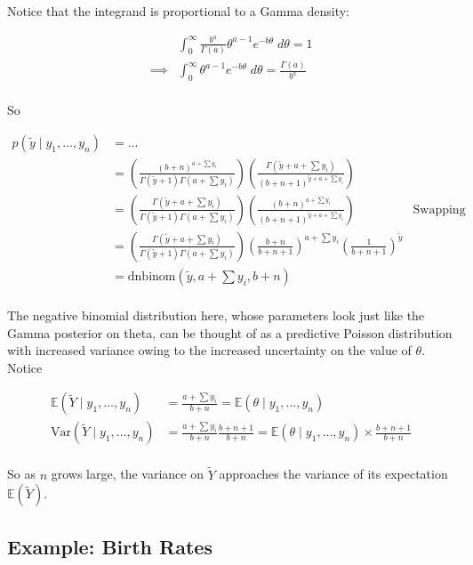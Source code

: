 \documentclass[
]{article}
\begin{document}
Notice that the integrand is proportional to a Gamma density:

\begin{align}
& \int_0^{\infty} \frac{b^a}{\Gamma(a)} \theta^{a - 1} e^{-b \theta} \; d\theta = 1\\
\implies& \int_0^{\infty} \theta^{a - 1} e^{-b\theta} \; d\theta = \frac{\Gamma(a)}{b^a} \\
\end{align}

So

\begin{align}
p(\tilde{y} \mid y_1, \dots, y_n) &= \dots \\
&= \left( \frac{(b + n)^{a + \sum y_i}}{\Gamma(\tilde{y} + 1) \Gamma(a + \sum y_i)} \right) \left( \frac{\Gamma(\tilde{y} + a + \sum y_i)}{(b + n + 1)^{\tilde{y} + a + \sum y_i}} \right) \\
&= \left( \frac{\Gamma(\tilde{y} + a + \sum y_i)}{\Gamma(\tilde{y} + 1) \Gamma(a + \sum y_i)} \right) \left( \frac{(b + n)^{a + \sum y_i}}{(b + n + 1)^{\tilde{y} + a + \sum y_i}} \right) & \text{Swapping numerators} \\
&= \left( \frac{\Gamma(\tilde{y} + a + \sum y_i)}{\Gamma(\tilde{y} + 1) \Gamma(a + \sum y_i)} \right) \left( \frac{b + n}{b + n + 1} \right)^{a + \sum y_i} \left( \frac{1}{b + n + 1} \right)^{\tilde{y}} \\
&= \text{dnbinom}(\tilde{y}, a + \sum y_i, b + n) \\
\end{align}

The negative binomial distribution here, whose parameters look just like
the Gamma posterior on theta, can be thought of as a predictive Poisson
distribution with increased variance owing to the increased uncertainty
on the value of \(\theta\). Notice

\begin{align}
\mathbb{E}(\tilde{Y} \mid y_1, \dots, y_n) &= \frac{a + \sum y_i}{b + n} = \mathbb{E}(\theta \mid y_1, \dots, y_n) \\
\text{Var}(\tilde{Y} \mid y_1, \dots, y_n) &= \frac{a + \sum y_i}{b + n} \frac{b
+ n + 1}{b + n} = \mathbb{E}(\theta \mid y_1, \dots, y_n) \times \frac{b + n + 1}{b + n}
\\
\end{align}

So as \(n\) grows large, the variance on \(\tilde{Y}\) approaches the
variance of its expectation \(\mathbb{E}(\tilde{Y})\).

\hypertarget{example-birth-rates}{%
\subsection{Example: Birth Rates}\label{example-birth-rates}}
\end{document}

